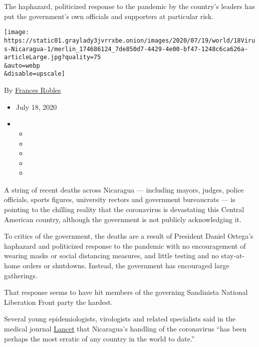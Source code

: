 The haphazard, politicized response to the pandemic by the country's
leaders has put the government's own officials and supporters at
particular risk.

\texttt{[image: https://static01.graylady3jvrrxbe.onion/images/2020/07/19/world/18Virus-Nicaragua-1/merlin\_174686124\_7de850d7-4429-4e00-bf47-1248c6ca626a-articleLarge.jpg?quality=75\\\&auto=webp\\\&disable=upscale]}

By \href{https://www.nytimes3xbfgragh.onion/by/frances-robles}{Frances
Robles}

\begin{itemize}
\item
  July 18, 2020
\item
  \begin{itemize}
  \item
  \item
  \item
  \item
  \item
  \end{itemize}
\end{itemize}

A string of recent deaths across Nicaragua --- including mayors, judges,
police officials, sports figures, university rectors and government
bureaucrats --- is pointing to the chilling reality that the coronavirus
is devastating this Central American country, although the government is
not publicly acknowledging it.

To critics of the government, the deaths are a result of President
Daniel Ortega's haphazard and politicized response to the pandemic with
no encouragement of wearing masks or social distancing measures, and
little testing and no stay-at-home orders or shutdowns. Instead, the
government has encouraged large gatherings.

That response seems to have hit members of the governing Sandinista
National Liberation Front party the hardest.

Several young epidemiologists, virologists and related specialists said
in the medical journal
\href{https://www.thelancet.com/journals/lancet/article/PIIS2214-109X(20)30131-5/fulltext?dgcid=hubspot_email_newsletter_tlcoronavirus20\&utm_campaign=tlcoronavirus20\&utm_source=hs_email\&utm_medium=email\&utm_content=86078269\&_hsenc=p2ANqtz-8f41qmrV7u85F68lutTKp1slx_xOXyc5Fzu2qUDWAPfChM4bWOSz6vuQmIHdTNvM_69PLdY4i7CCZhq1NZ4uM2lCLUgA\&_hsmi=86078269}{Lancet}
that Nicaragua's handling of the coronavirus ``has been perhaps the most
erratic of any country in the world to date.''

